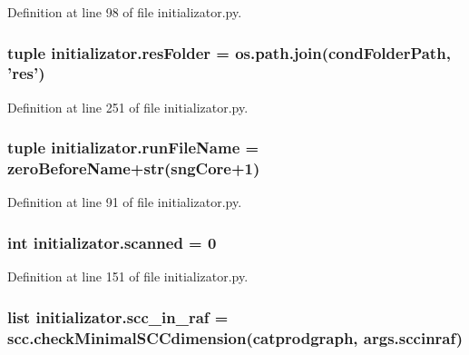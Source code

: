 Definition at line 98 of file initializator.\-py.

\hypertarget{a00104_ae3ceb468287bbef82c0134b3eeea4419}{
\subsubsection[{res\-Folder}]{\setlength{\rightskip}{0pt plus 5cm}tuple initializator.\-res\-Folder = os.\-path.\-join({\bf cond\-Folder\-Path}, 'res')}}\label{a00104_ae3ceb468287bbef82c0134b3eeea4419}


Definition at line 251 of file initializator.\-py.

\hypertarget{a00104_a47868487619848c8ead2458c6855426a}{
\subsubsection[{run\-File\-Name}]{\setlength{\rightskip}{0pt plus 5cm}tuple initializator.\-run\-File\-Name = {\bf zero\-Before\-Name}+str(sng\-Core+1)}}\label{a00104_a47868487619848c8ead2458c6855426a}


Definition at line 91 of file initializator.\-py.

\hypertarget{a00104_afafc4f533cad86cb7fd1b6fe5ed9effa}{
\subsubsection[{scanned}]{\setlength{\rightskip}{0pt plus 5cm}int initializator.\-scanned = 0}}\label{a00104_afafc4f533cad86cb7fd1b6fe5ed9effa}


Definition at line 151 of file initializator.\-py.

\hypertarget{a00104_a528fd8494c795cfcb3810626c84ae291}{
\subsubsection[{scc\-\_\-in\-\_\-raf}]{\setlength{\rightskip}{0pt plus 5cm}list initializator.\-scc\-\_\-in\-\_\-raf = scc.\-check\-Minimal\-S\-C\-Cdimension({\bf catprodgraph}, args.\-sccinraf)}}\label{a00104_a528fd8494c795cfcb3810626c84ae291}


